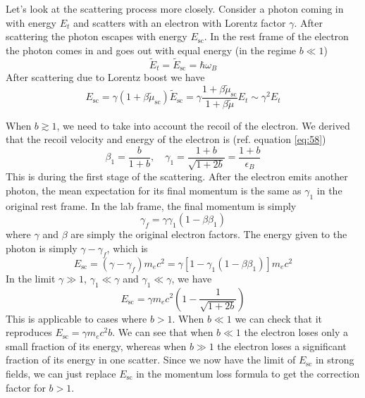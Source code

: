 \documentclass[letterpaper, 11pt]{article}
\numberwithin{equation}{section}
\numberwithin{figure}{section}
\begin{document}
Let's look at the scattering process more closely. Consider a photon coming in with energy $E_t$ and scatters with an electron with Lorentz factor $\gamma$. After scattering the photon escapes with energy $E_\mathrm{sc}$. In the rest frame of the electron the photon comes in and goes out with equal energy (in the regime $b\ll 1$)
\begin{equation}
    \label{eq:79}
    \tilde{E}_t = \tilde{E}_\mathrm{sc} = \hbar\omega_B
\end{equation}
After scattering due to Lorentz boost we have
\begin{equation}
    \label{eq:80}
    E_\mathrm{sc} = \gamma (1 + \beta\tilde{\mu}_\mathrm{sc})\tilde{E}_\mathrm{sc} = \gamma\frac{1 + \beta\tilde{\mu}_\mathrm{sc}}{1 + \beta\tilde{\mu}}E_t \sim \gamma^2E_t
\end{equation}

When $b \gtrsim 1$, we need to take into account the recoil of the electron. We derived that the recoil velocity and energy of the electron is (ref. equation \eqref{eq:58})
\begin{equation}
    \label{eq:81}
    \beta_1 = \frac{b}{1 + b},\quad \gamma_1 = \frac{1 + b}{\sqrt{1 + 2b}} = \frac{1 + b}{\epsilon_B}
\end{equation}
This is during the first stage of the scattering. After the electron emits another photon, the mean expectation for its final momentum is the same as $\gamma_1$ in the original rest frame. In the lab frame, the final momentum is simply
\begin{equation}
    \label{eq:82}
    \gamma_f = \gamma\gamma_1(1 - \beta\beta_1)
\end{equation}
where $\gamma$ and $\beta$ are simply the original electron factors. The energy given to the photon is simply $\gamma - \gamma_f$, which is
\begin{equation}
    \label{eq:83}
    E_\mathrm{sc} = (\gamma - \gamma_f)m_ec^2 = \gamma \left[ 1 - \gamma_1(1 - \beta\beta_1) \right]m_ec^2
\end{equation}
In the limit $\gamma \gg 1$, $\gamma_1\ll \gamma$ and $\gamma_1\ll \gamma$, we have
\begin{equation}
    \label{eq:84}
    E_\mathrm{sc} = \gamma m_ec^2 \left( 1 - \frac{1}{\sqrt{1 + 2b}} \right)
\end{equation}
This is applicable to cases where $b > 1$. When $b\ll 1$ we can check that it reproduces $E_\mathrm{sc} = \gamma m_ec^2b$. We can see that when $b\ll 1$ the electron loses only a small fraction of its energy, whereas when $b\gg 1$ the electron loses a significant fraction of its energy in one scatter. Since we now have the limit of $E_\mathrm{sc}$ in strong fields, we can just replace $E_\mathrm{sc}$ in the momentum loss formula to get the correction factor for $b>1$.
\end{document}
